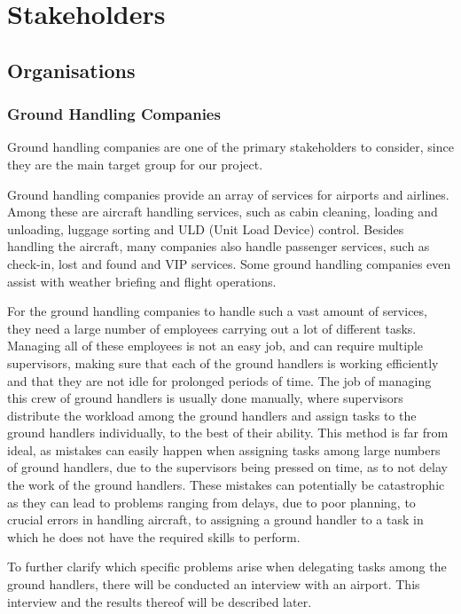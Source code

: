 \chapter{Stakeholders}
\section{Organisations}
\subsection{Ground Handling Companies}
Ground handling companies are one of the primary stakeholders to consider, since they are the main target group for our project.

Ground handling companies provide an array of services for airports and airlines. Among these are aircraft handling services, such as cabin cleaning, loading and unloading, luggage sorting and ULD (Unit Load Device) control. Besides handling the aircraft, many companies also handle passenger services, such as check-in, lost and found and VIP services. Some ground handling companies even assist with weather briefing and flight operations.

For the ground handling companies to handle such a vast amount of services, they need a large number of employees carrying out a lot of different tasks. Managing all of these employees is not an easy job, and can require multiple supervisors, making sure that each of the ground handlers is working efficiently and that they are not idle for prolonged periods of time. The job of managing this crew of ground handlers is usually done manually, where supervisors distribute the workload among the ground handlers and assign tasks to the ground handlers individually, to the best of their ability.
This method is far from ideal, as mistakes can easily happen when assigning tasks among large numbers of ground handlers, due to the supervisors being pressed on time, as to not delay the work of the ground handlers. These mistakes can potentially be catastrophic as they can lead to problems ranging from delays, due to poor planning, to crucial errors in handling aircraft, to assigning a ground handler to a task in which he does not have the required skills to perform.

To further clarify which specific problems arise when delegating tasks among the ground handlers, there will be conducted an interview with an airport. This interview and the results thereof will be described later.

%

